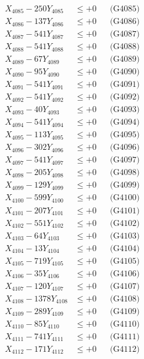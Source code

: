 \documentclass[a4paper,10pt]{article}
\begin{document}
{\begin{align}
X_{4085} - 250Y_{4085} &\leq +0 && \text{(G4085)} \\
X_{4086} - 137Y_{4086} &\leq +0 && \text{(G4086)} \\
X_{4087} - 541Y_{4087} &\leq +0 && \text{(G4087)} \\
X_{4088} - 541Y_{4088} &\leq +0 && \text{(G4088)} \\
X_{4089} - 67Y_{4089} &\leq +0 && \text{(G4089)} \\
X_{4090} - 95Y_{4090} &\leq +0 && \text{(G4090)} \\
\allowbreak
X_{4091} - 541Y_{4091} &\leq +0 && \text{(G4091)} \\
X_{4092} - 541Y_{4092} &\leq +0 && \text{(G4092)} \\
X_{4093} - 40Y_{4093} &\leq +0 && \text{(G4093)} \\
X_{4094} - 541Y_{4094} &\leq +0 && \text{(G4094)} \\
X_{4095} - 113Y_{4095} &\leq +0 && \text{(G4095)} \\
X_{4096} - 302Y_{4096} &\leq +0 && \text{(G4096)} \\
X_{4097} - 541Y_{4097} &\leq +0 && \text{(G4097)} \\
X_{4098} - 205Y_{4098} &\leq +0 && \text{(G4098)} \\
X_{4099} - 129Y_{4099} &\leq +0 && \text{(G4099)} \\
X_{4100} - 599Y_{4100} &\leq +0 && \text{(G4100)} \\
\allowbreak
X_{4101} - 207Y_{4101} &\leq +0 && \text{(G4101)} \\
X_{4102} - 551Y_{4102} &\leq +0 && \text{(G4102)} \\
X_{4103} - 64Y_{4103} &\leq +0 && \text{(G4103)} \\
X_{4104} - 13Y_{4104} &\leq +0 && \text{(G4104)} \\
X_{4105} - 719Y_{4105} &\leq +0 && \text{(G4105)} \\
X_{4106} - 35Y_{4106} &\leq +0 && \text{(G4106)} \\
X_{4107} - 120Y_{4107} &\leq +0 && \text{(G4107)} \\
X_{4108} - 1378Y_{4108} &\leq +0 && \text{(G4108)} \\
X_{4109} - 289Y_{4109} &\leq +0 && \text{(G4109)} \\
X_{4110} - 85Y_{4110} &\leq +0 && \text{(G4110)} \\
\allowbreak
X_{4111} - 741Y_{4111} &\leq +0 && \text{(G4111)} \\
X_{4112} - 171Y_{4112} &\leq +0 && \text{(G4112)} \\

\end{align}}
\end{document}
